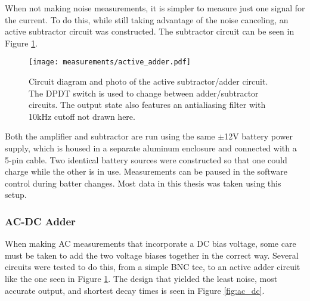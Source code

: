 When not making noise measurements, it is simpler to measure just one signal for the current. To do this, while still taking advantage of the noise canceling, an active subtractor circuit was constructed. The subtractor circuit can be seen in Figure \ref{fig:subtractor}. 

\begin{figure}
    \centering
    \texttt{[image: measurements/active\_adder.pdf]}
    \caption{Circuit diagram and photo of the active subtractor/adder circuit. The DPDT switch is used to change between adder/subtractor circuits. The output state also features an antialiasing filter with 10kHz cutoff not drawn here.}
    \label{fig:subtractor}
\end{figure}

Both the amplifier and subtractor are run using the same $\pm$12V battery power supply, which is housed in a separate aluminum enclosure and connected with a 5-pin cable. Two identical battery sources were constructed so that one could charge while the other is in use. Measurements can be paused in the software control during batter changes. Most data in this thesis was taken using this setup.


\subsubsection*{AC-DC Adder}
\label{sec:adder}

When making AC measurements that incorporate a DC bias voltage, some care must be taken to add the two voltage biases together in the correct way. Several circuits were tested to do this, from a simple BNC tee, to an active adder circuit like the one seen in Figure \ref{fig:subtractor}. The design that yielded the least noise, most accurate output, and shortest decay times is seen in Figure \ref{fig:ac_dc}.

